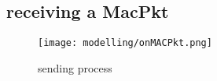 \subsection{receiving a MacPkt}


\begin{figure}[h]
 \centering
 \texttt{[image: modelling/onMACPkt.png]}
 \caption{sending process}
 \label{fig: sending process}
\end{figure}























